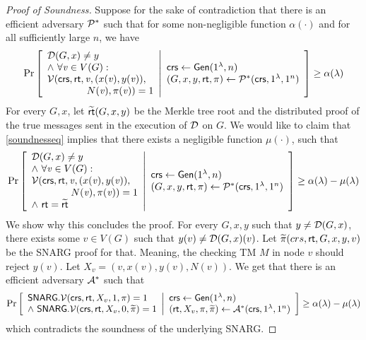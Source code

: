 \begin{proof}[Proof of Soundness]
Suppose for the sake of contradiction that there is an efficient adversary $\mathcal{P}^*$ such that for some
non-negligible function $\alpha(\cdot)$
and for all sufficiently large $n$,
we have
\begin{gather}\label{soundnesseq}
    \Pr \left[ \begin{array}{ll} 
    \mathcal{D}(G, x)\neq y 
    \\\wedge  ~\forall \mathit{ v }\in V(G) : \\
    \mathcal{V}(\mathsf{crs}, \mathsf{rt}, \mathit{ v }, (x(\mathit{ v }), y(\mathit{ v })),\\
    \qquad \qquad N(\mathit{ v }), \pi(\mathit{ v })) = 1
     \end{array} \middle\vert \begin{array}{ll} 
    \mathsf{crs} \leftarrow \mathsf{Gen}(1^\lambda, n) \\
    (G, x, y, \mathsf{rt}, \pi) \leftarrow \mathcal{P}^*(\mathsf{crs}, 1^\lambda, 1^n)
     \end{array} \right] \geq \alpha(\lambda)
\end{gather}
For every $G,x$, let $\widetilde{\mathsf{rt}}(G,x,y)$ be the Merkle tree root and the distributed proof of the true messages sent in the execution of $\mathcal{D}$ on $G$. We would like to claim that \cref{soundnesseq} implies that there exists a negligible function $\mu(\cdot)$, such that
\begin{gather}\label{same_rt_eq}
    \Pr \left[ \begin{array}{ll} 
    \mathcal{D}(G, x)\neq y \\ 
    \wedge\ \forall \mathit{ v }\in V(G) : \\
    \mathcal{V}(\mathsf{crs}, \mathsf{rt}, \mathit{ v }, (x(\mathit{ v }), y(\mathit{ v })),\\
    \qquad \qquad N(\mathit{ v }), \pi(\mathit{ v })) = 1 \\
    \wedge ~\mathsf{rt} = \widetilde{\mathsf{rt}}
     \end{array} \middle\vert \begin{array}{ll} 
    \mathsf{crs} \leftarrow \mathsf{Gen}(1^\lambda, n) \\
    (G, x, y, \mathsf{rt}, \pi) \leftarrow \mathcal{P}^*(\mathsf{crs}, 1^\lambda, 1^n)
     \end{array} \right] \geq \alpha(\lambda) - \mu(\lambda)
\end{gather}
We show why this concludes the proof. For every $G,x,y$ such that $y\neq \mathcal{D}(G,x)$, there exists some $v\in V(G)$ such that $y(v)\neq \mathcal{D}(G,x)(v)$. Let $\widetilde{\pi}(crs, \mathsf{rt}, G,x,y,v)$ be the SNARG proof for that. Meaning, the checking TM $M$ in node $v$ should reject $y(v)$. Let $X_v = (v, x(v), y(v), N(v))$. We get that there is an efficient adversary $\mathcal{A}^*$ such that
\begin{gather*}\label{same_rt}
    \Pr \left[ \begin{array}{ll} 
    \mathsf{SNARG}.\mathcal{V}(\mathsf{crs}, \mathsf{rt}, X_v, 1, \pi) = 1 \\
    \wedge ~\mathsf{SNARG}.\mathcal{V}(\mathsf{crs}, \mathsf{rt}, X_v, 0, \widetilde{\pi}) = 1
     \end{array} \middle\vert \begin{array}{ll} 
    \mathsf{crs} \leftarrow \mathsf{Gen}(1^\lambda, n) \\
    (\mathsf{rt}, X_v, \pi, \widetilde{\pi}) \leftarrow \mathcal{A}^*(\mathsf{crs}, 1^\lambda, 1^n)
     \end{array} \right] \geq \alpha(\lambda) - \mu(\lambda)
\end{gather*}
which contradicts the soundness of the underlying SNARG.


\end{proof}
